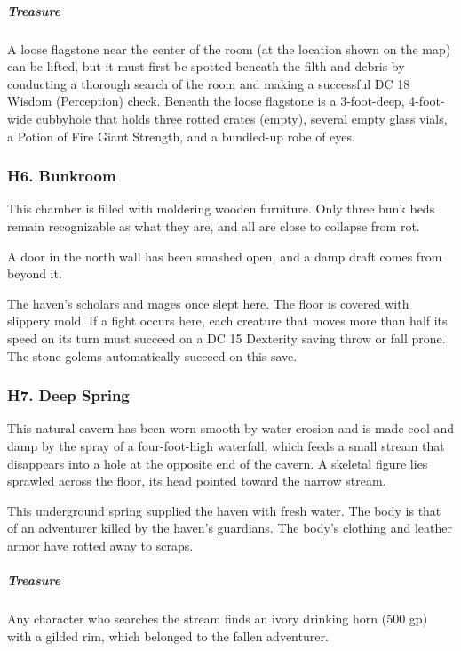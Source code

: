 \documentclass[10pt,a4paper,twoside,bg=print,twocolumn,openany,nodeprecatedcode]{dndbook}
\begin{document}
\subparagraph{Treasure}
A loose flagstone near the center of the room (at the location shown on the map) can be lifted, but it must first be spotted beneath the filth and debris by conducting a thorough search of the room and making a successful DC 18 Wisdom (Perception) check. Beneath the loose flagstone is a 3-foot-deep, 4-foot-wide cubbyhole that holds three rotted crates (empty), several empty glass vials, a Potion of Fire Giant Strength, and a bundled-up robe of eyes.

\subsubsection{H6. Bunkroom}
\begin{DndReadAloud}{}
This chamber is filled with moldering wooden furniture. Only three bunk beds remain recognizable as what they are, and all are close to collapse from rot.

A door in the north wall has been smashed open, and a damp draft comes from beyond it.

\end{DndReadAloud}

The haven's scholars and mages once slept here. The floor is covered with slippery mold. If a fight occurs here, each creature that moves more than half its speed on its turn must succeed on a DC 15 Dexterity saving throw or fall prone. The stone golems automatically succeed on this save.

\subsubsection{H7. Deep Spring}
\begin{DndReadAloud}{}
This natural cavern has been worn smooth by water erosion and is made cool and damp by the spray of a four-foot-high waterfall, which feeds a small stream that disappears into a hole at the opposite end of the cavern. A skeletal figure lies sprawled across the floor, its head pointed toward the narrow stream.

\end{DndReadAloud}

This underground spring supplied the haven with fresh water. The body is that of an adventurer killed by the haven's guardians. The body's clothing and leather armor have rotted away to scraps.

\subparagraph{Treasure}
Any character who searches the stream finds an ivory drinking horn (500 gp) with a gilded rim, which belonged to the fallen adventurer.
\end{document}
